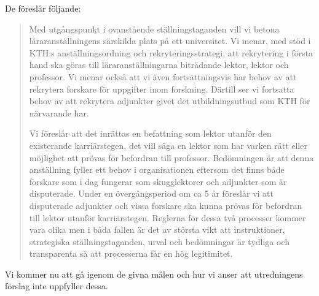 \documentclass[a4paper,oneside,article,swedish]{memoir}
\begin{document}
De föreslår följande:
\blockcquote[s.~2]{utredning}{%
  Med utgångspunkt i ovanstående ställningstaganden vill vi betona 
  läraranställningens
  särskilda plats på ett universitet. Vi menar, med stöd i KTH:s 
  anställningsordning och
  rekryteringsstrategi, att rekrytering i första hand ska göras till 
  läraranställningarna
  biträdande lektor, lektor och professor. Vi menar också att vi även 
  fortsättningsvis har behov
  av att rekrytera forskare för uppgifter inom forskning. Därtill ser vi 
  fortsatta behov av att
  rekrytera adjunkter givet det utbildningsutbud som KTH för närvarande har.

  Vi föreslår att det inrättas en befattning som lektor utanför den existerande 
  karriärstegen, det
  vill säga en lektor som har varken rätt eller möjlighet att prövas för 
  befordran till professor.
  Bedömningen är att denna anställning fyller ett behov i organisationen 
  eftersom det finns
  både forskare som i dag fungerar som skugglektorer och adjunkter som är 
  disputerade. Under
  en övergångsperiod om ca 5 år föreslår vi att disputerade adjunkter och vissa 
  forskare ska
  kunna prövas för befordran till lektor utanför karriärstegen. Reglerna för 
  dessa två processer
  kommer vara olika men i båda fallen är det av största vikt att instruktioner, 
  strategiska
  ställningstaganden, urval och bedömningar är tydliga och transparenta så att 
  processerna får
  en hög legitimitet.%
%
%
}
Vi kommer nu att gå igenom de givna målen och hur vi anser att utredningens 
förslag inte uppfyller dessa.
\end{document}
